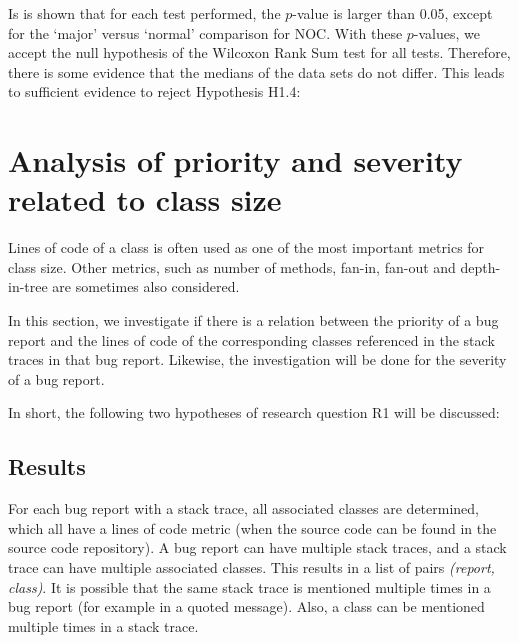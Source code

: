 Is is shown that for each test performed, the $p$-value is larger than 0.05, except for the `major' versus `normal' comparison for NOC. With these $p$-values, we accept the null hypothesis of the Wilcoxon Rank Sum test for all tests. Therefore, there is some evidence that the medians of the data sets do not differ. This leads to sufficient evidence to reject Hypothesis H1.4:

\vspace{\baselineskip}
\hypad{}
\vspace{\baselineskip}


\section{Analysis of priority and severity related to class size} %
\label{sec:analysis_of_priority_and_severity_related_to_lines_of_code}
Lines of code of a class is often used as one of the most important metrics for class size. Other metrics, such as number of methods, fan-in, fan-out and depth-in-tree are sometimes also considered.

In this section, we investigate if there is a relation between the priority of a bug report and the lines of code of the corresponding classes referenced in the stack traces in that bug report. Likewise, the investigation will be done for the severity of a bug report. 

In short, the following two hypotheses of research question R1 will be discussed: 

\vspace{\baselineskip}
\hypae{}

\vspace{\baselineskip}
\hypaf{}

\vspace{\baselineskip}

\subsection{Results} %
For each bug report with a stack trace, all associated classes are determined, which all have a lines of code metric (when the source code can be found in the source code repository). A bug report can have multiple stack traces, and a stack trace can have multiple associated classes. This results in a list of pairs \emph{(report, class)}. It is possible that the same stack trace is mentioned multiple times in a bug report (for example in a quoted message). Also, a class can be mentioned multiple times in a stack trace. 

